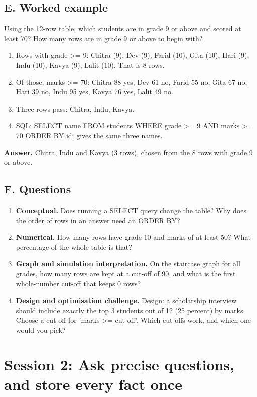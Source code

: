 \documentclass[11pt,a4paper]{article}
\begin{document}
\subsection*{E. Worked example}
Using the 12-row table, which students are in grade 9 or above and scored at least 70? How many rows are in grade 9 or above to begin with?
\begin{enumerate}[nosep]
\item Rows with grade \textgreater{}= 9: Chitra (9), Dev (9), Farid (10), Gita (10), Hari (9), Indu (10), Kavya (9), Lalit (10). That is 8 rows.
\item Of those, marks \textgreater{}= 70: Chitra 88 yes, Dev 61 no, Farid 55 no, Gita 67 no, Hari 39 no, Indu 95 yes, Kavya 76 yes, Lalit 49 no.
\item Three rows pass: Chitra, Indu, Kavya.
\item SQL: SELECT name FROM students WHERE grade \textgreater{}= 9 AND marks \textgreater{}= 70 ORDER BY id; gives the same three names.
\end{enumerate}
\textbf{Answer.} Chitra, Indu and Kavya (3 rows), chosen from the 8 rows with grade 9 or above.

\subsection*{F. Questions}
\begin{enumerate}[nosep]
\item \textbf{Conceptual.} Does running a SELECT query change the table? Why does the order of rows in an answer need an ORDER BY?
\item \textbf{Numerical.} How many rows have grade 10 and marks of at least 50? What percentage of the whole table is that?
\item \textbf{Graph and simulation interpretation.} On the staircase graph for all grades, how many rows are kept at a cut-off of 90, and what is the first whole-number cut-off that keeps 0 rows?
\item \textbf{Design and optimisation challenge.} Design: a scholarship interview should include exactly the top 3 students out of 12 (25 percent) by marks. Choose a cut-off for 'marks \textgreater{}= cut-off'. Which cut-offs work, and which one would you pick?
\end{enumerate}

\section{Session 2: Ask precise questions, and store every fact once}
\end{document}
